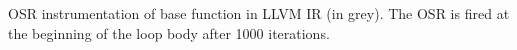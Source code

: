 \label{fig:isordfrom} OSR instrumentation of base function in LLVM IR (in grey). The OSR is fired at the beginning of the loop body after 1000 iterations.
